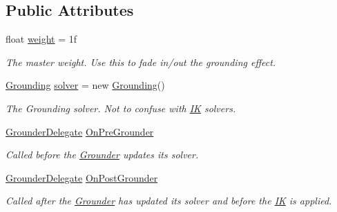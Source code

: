 \subsection*{Public Attributes}
\begin{DoxyCompactItemize}
\item 
float \mbox{\hyperlink{class_root_motion_1_1_final_i_k_1_1_grounder_a129a12c892c7ced564f487e7f910c520}{weight}} = 1f
\begin{DoxyCompactList}\small\item\em The master weight. Use this to fade in/out the grounding effect. \end{DoxyCompactList}\item 
\mbox{\hyperlink{class_root_motion_1_1_final_i_k_1_1_grounding}{Grounding}} \mbox{\hyperlink{class_root_motion_1_1_final_i_k_1_1_grounder_ae1f97fd6d0348de0b05834d62de1bcd9}{solver}} = new \mbox{\hyperlink{class_root_motion_1_1_final_i_k_1_1_grounding}{Grounding}}()
\begin{DoxyCompactList}\small\item\em The Grounding solver. Not to confuse with \mbox{\hyperlink{class_root_motion_1_1_final_i_k_1_1_i_k}{IK}} solvers. \end{DoxyCompactList}\item 
\mbox{\hyperlink{class_root_motion_1_1_final_i_k_1_1_grounder_a1278cd21a3c872dbda95d63ac710cc26}{Grounder\+Delegate}} \mbox{\hyperlink{class_root_motion_1_1_final_i_k_1_1_grounder_ad2369034912f11639ec0109f17c00a82}{On\+Pre\+Grounder}}
\begin{DoxyCompactList}\small\item\em Called before the \mbox{\hyperlink{class_root_motion_1_1_final_i_k_1_1_grounder}{Grounder}} updates it\textquotesingle{}s solver. \end{DoxyCompactList}\item 
\mbox{\hyperlink{class_root_motion_1_1_final_i_k_1_1_grounder_a1278cd21a3c872dbda95d63ac710cc26}{Grounder\+Delegate}} \mbox{\hyperlink{class_root_motion_1_1_final_i_k_1_1_grounder_a393fcecff1731ec1eb8aebefd2827ec4}{On\+Post\+Grounder}}
\begin{DoxyCompactList}\small\item\em Called after the \mbox{\hyperlink{class_root_motion_1_1_final_i_k_1_1_grounder}{Grounder}} has updated it\textquotesingle{}s solver and before the \mbox{\hyperlink{class_root_motion_1_1_final_i_k_1_1_i_k}{IK}} is applied. \end{DoxyCompactList}\end{DoxyCompactItemize}
